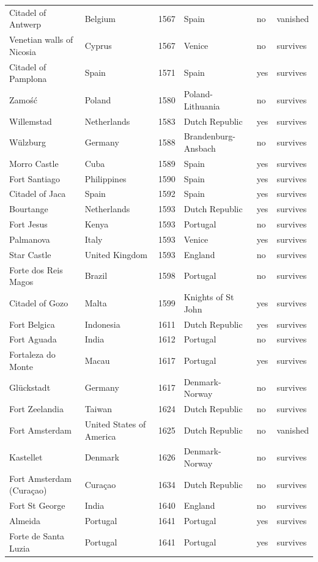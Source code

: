 \documentclass[11pt,a4paper]{article}
\begin{document}
{\begin{longtable}{p{4.6cm}p{3.2cm}rp{3.2cm}ll}
Citadel of Antwerp & Belgium & 1567 & Spain & no & vanished\\
Venetian walls of Nicosia & Cyprus & 1567 & Venice & no & survives\\
Citadel of Pamplona & Spain & 1571 & Spain & yes & survives\\
Zamość & Poland & 1580 & Poland-Lithuania & no & survives\\
Willemstad & Netherlands & 1583 & Dutch Republic & yes & survives\\
Wülzburg & Germany & 1588 & Brandenburg-Ansbach & no & survives\\
Morro Castle & Cuba & 1589 & Spain & yes & survives\\
Fort Santiago & Philippines & 1590 & Spain & yes & survives\\
Citadel of Jaca & Spain & 1592 & Spain & yes & survives\\
Bourtange & Netherlands & 1593 & Dutch Republic & yes & survives\\
Fort Jesus & Kenya & 1593 & Portugal & no & survives\\
Palmanova & Italy & 1593 & Venice & yes & survives\\
Star Castle & United Kingdom & 1593 & England & no & survives\\
Forte dos Reis Magos & Brazil & 1598 & Portugal & no & survives\\
Citadel of Gozo & Malta & 1599 & Knights of St John & yes & survives\\
Fort Belgica & Indonesia & 1611 & Dutch Republic & yes & survives\\
Fort Aguada & India & 1612 & Portugal & no & survives\\
Fortaleza do Monte & Macau & 1617 & Portugal & yes & survives\\
Glückstadt & Germany & 1617 & Denmark-Norway & no & survives\\
Fort Zeelandia & Taiwan & 1624 & Dutch Republic & no & survives\\
Fort Amsterdam & United States of America & 1625 & Dutch Republic & no & vanished\\
Kastellet & Denmark & 1626 & Denmark-Norway & no & survives\\
Fort Amsterdam (Curaçao) & Curaçao & 1634 & Dutch Republic & no & survives\\
Fort St George & India & 1640 & England & no & survives\\
Almeida & Portugal & 1641 & Portugal & yes & survives\\
Forte de Santa Luzia & Portugal & 1641 & Portugal & yes & survives\\

\end{longtable}}
\end{document}
